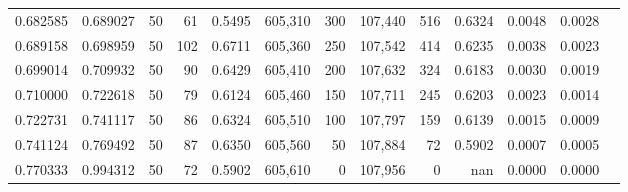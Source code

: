 \begin{tabular}{rrrrrrrrrrrrr}
0.682585 & 0.689027 &    50 &  61 &                                     0.5495 & 605,310 &     300 & 107,440 &     516 & 0.6324 & 0.0048 & 0.0028 \\
0.689158 & 0.698959 &    50 & 102 &                                     0.6711 & 605,360 &     250 & 107,542 &     414 & 0.6235 & 0.0038 & 0.0023 \\
0.699014 & 0.709932 &    50 &  90 &                                     0.6429 & 605,410 &     200 & 107,632 &     324 & 0.6183 & 0.0030 & 0.0019 \\
0.710000 & 0.722618 &    50 &  79 &                                     0.6124 & 605,460 &     150 & 107,711 &     245 & 0.6203 & 0.0023 & 0.0014 \\
0.722731 & 0.741117 &    50 &  86 &                                     0.6324 & 605,510 &     100 & 107,797 &     159 & 0.6139 & 0.0015 & 0.0009 \\
0.741124 & 0.769492 &    50 &  87 &                                     0.6350 & 605,560 &      50 & 107,884 &      72 & 0.5902 & 0.0007 & 0.0005 \\
0.770333 & 0.994312 &    50 &  72 &                                     0.5902 & 605,610 &       0 & 107,956 &       0 &    nan & 0.0000 & 0.0000 \\
\bottomrule
\end{tabular}
